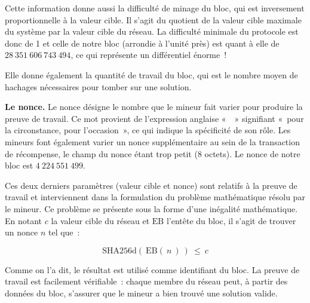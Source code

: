 Cette information donne aussi la difficulté de minage du bloc, qui est inversement proportionnelle à la valeur cible. Il s'agit du quotient de la valeur cible maximale du système par la valeur cible du réseau. La difficulté minimale du protocole est donc de 1 et celle de notre bloc (arrondie à l'unité près) est quant à elle de $28~351~606~743~494$, ce qui représente un différentiel énorme~!

Elle donne également la quantité de travail du bloc, qui est le nombre moyen de hachages nécessaires pour tomber sur une solution.


\textbf{Le nonce.} Le nonce désigne le nombre que le mineur fait varier pour produire la preuve de travail. Ce mot provient de l'expression anglaise «~~» signifiant «~pour la circonstance, pour l'occasion~», ce qui indique la spécificité de son rôle. Les mineurs font également varier un nonce supplémentaire au sein de la transaction de récompense, le champ du nonce étant trop petit (8 octets). Le nonce de notre bloc est $4~224~551~499$.

Ces deux derniers paramètres (valeur cible et nonce) sont relatifs à la preuve de travail et interviennent dans la formulation du problème mathématique résolu par le mineur. Ce problème se présente sous la forme d'une inégalité mathématique. En notant $c$ la valeur cible du réseau et $\mathrm{EB}$ l'entête du bloc, il s'agit de trouver un nonce $n$ tel que~:

{ \small
\[
\mathrm{SHA256d} ( \ \mathrm{EB} ( \ n \ ) \ ) ~ \le ~ c
\]
}

Comme on l'a dit, le résultat est utilisé comme identifiant du bloc. La preuve de travail est facilement vérifiable~: chaque membre du réseau peut, à partir des données du bloc, s'assurer que le mineur a bien trouvé une solution valide. %

